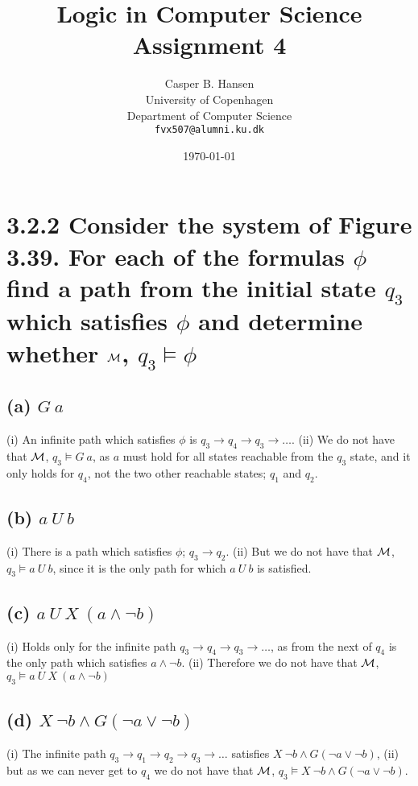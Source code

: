 \documentclass[11pt,a4paper]{article}
\title
{
{\Large Logic in Computer Science}\\
Assignment 4
}
\author
{
	Casper B. Hansen\\
	University of Copenhagen\\
	Department of Computer Science\\
	{\tt fvx507@alumni.ku.dk}
}
\date{\today}
\let\imp\to
\begin{document}
\maketitle


\section*{3.2.2 \mdseries Consider the system of Figure 3.39. For each of the
formulas $\phi$ find a path from the initial state $q_3$ which satisfies
$\phi$ and determine whether $\cal M$, $q_3 \models \phi$}

\subsection*{(a) \mdseries $G{\ }a$}
(i) An infinite path which satisfies $\phi$ is $q_3 \imp q_4 \imp q_3 \imp
\dots$. (ii) We do not have that $\cal M$, $q_3 \models G{\ }a$, as $a$ must
hold for all states reachable from the $q_3$ state, and it only holds for
$q_4$, not the two other reachable states; $q_1$ and $q_2$.

\subsection*{(b) \mdseries $a{\ }U{\ }b$}
(i) There is a path which satisfies $\phi$; $q_3 \imp q_2$. (ii) But we do
not have that $\cal M$, $q_3 \models a{\ }U{\ }b$, since it is the only path
for which $a{\ }U{\ }b$ is satisfied.

\subsection*{(c) \mdseries $a{\ }U{\ }X{\ }(a \land \neg b)$}
(i) Holds only for the infinite path $q_3 \imp q_4 \imp q_3 \imp \dots$, as
from the next of $q_4$ is the only path which satisfies $a \land \neg b$. (ii)
Therefore we do not have that $\cal M$, $q_3 \models a{\ }U{\ }X{\ }(a \land
\neg b)$

\subsection*{(d) \mdseries $X{\ }\neg b \land G(\neg a \lor \neg b)$}
(i) The infinite path $q_3 \imp q_1 \imp q_2 \imp q_3 \imp \dots$ satisfies
$X{\ }\neg b \land G(\neg a \lor \neg b)$, (ii) but as we can never get to
$q_4$ we do not have that $\cal M$, $q_3 \models X{\ }\neg b \land G(\neg a
\lor \neg b)$.
\end{document}
